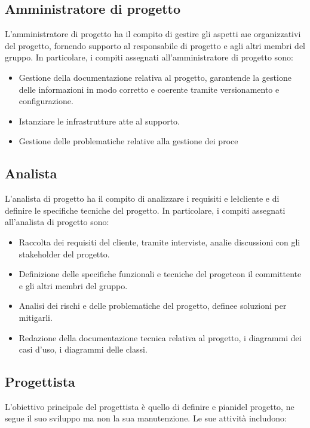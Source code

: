 \subsection{Amministratore di progetto}
L'amministratore di progetto ha il compito di gestire gli aspetti a\i e organizzativi del progetto, fornendo supporto al responsabile di progetto e agli altri membri del gruppo. In particolare, i compiti assegnati all'amministratore di progetto sono:

\begin{itemize}
\item Gestione della documentazione relativa al progetto, garantend\zione e la gestione delle informazioni in modo corretto e coerente tramite versionamento e configurazione.
\item Istanziare le infrastrutture atte al supporto.
\item Gestione delle problematiche relative alla gestione dei proce\
\end{itemize}

\subsection{Analista}
L'analista di progetto ha il compito di analizzare i requisiti e le\l cliente e di definire le specifiche tecniche del progetto. In particolare, i compiti assegnati all'analista di progetto sono:

\begin{itemize}
\item Raccolta dei requisiti del cliente, tramite interviste, anali\enti e discussioni con gli stakeholder del progetto.
\item Definizione delle specifiche funzionali e tecniche del proget\do con il committente e gli altri membri del gruppo.
\item Analisi dei rischi e delle problematiche del progetto, define\e e soluzioni per mitigarli.
\item Redazione della documentazione tecnica relativa al progetto, \pio i diagrammi dei casi d'uso, i diagrammi delle classi.
\end{itemize}

\subsection{Progettista}
L'obiettivo principale del progettista è quello di definire e piani\hitettura del progetto, ne segue il suo sviluppo ma non la sua manutenzione. Le sue attività includono:

